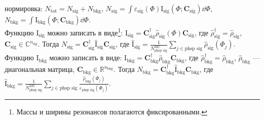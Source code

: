 \documentclass{beamer}
\begin{document}
\begin{frame}
\begin{minipage}[t]{0.49\linewidth}
  нормировка: $\textstyle{}N_{\text{tot}} = N_{\text{sig}} + N_{\text{bkg}}$,
  $\textstyle{}N_{\text{sig}}=\int\varepsilon_{\text{sig}}(\Phi)\text{I}_{\text{sig}}(\Phi;\bm{C}_{\text{sig}})\dd{\Phi}$,
  $\textstyle{}N_{\text{bkg}}=\int{}\text{I}_{\text{bkg}}(\Phi; \bm{C}_{\text{bkg}})\dd{\Phi}$.\\
  Функцию $\text{I}_{\text{sig}}$
  можно записать в виде\footnote{\scriptsize Массы и ширины резонансов полагаются
    фиксированными.}:
  $\textstyle{}\text{I}_{\text{sig}}=\bm{C}^{\dag}_{\text{sig}}\hat{\rho}_{\text{sig}}(\Phi)\bm{C}_{\text{sig}}$,
  где $\textstyle{}\hat{\rho}^{\dag}_{\text{sig}}=\hat{\rho}_{\text{sig}}$,
  $\textstyle{}\bm{C}_{\text{sig}}\in\mathbb{C}^{n_{\text{sig}}}$.
  Тогда $\textstyle{}N_{\text{sig}}=\bm{C}^{\dag}_{\text{sig}}\hat{\text{I}}_{\text{sig}}\bm{C}_{\text{sig}}$,
  где
  $\textstyle{}\hat{\text{I}}_{\text{sig}}=\frac{1}{N^{\text{MC}}_{\text{phsp sig}}}\sum_{j\in\text{phsp sig}}\hat{\rho}_{\text{sig}}(\Phi_j)$.\\
  Функцию $\textstyle{}\text{I}_{\text{bkg}}$ можно записать в виде:
  $\textstyle{}\text{I}_{\text{bkg}}=\bm{C}^{\dag}_{\text{bkg}}\hat{\rho}_{\text{bkg}}\bm{C}_{\text{bkg}}$, где
  $\textstyle{}\hat{\rho}^{\dag}_{\text{bkg}}=\hat{\rho}_{\text{bkg}}$, $\hat{\rho}_{\text{bkg}}$ ---
  диагональная матрица, $\bm{C}_{\text{bkg}}\in\mathbb{R}^{n_{\text{bkg}}}$. Тогда
  $\textstyle{}N_{\text{bkg}}=\bm{C}^{\dag}_{\text{bkg}}\hat{\text{I}}_{\text{bkg}}\bm{C}_{\text{bkg}}$, где
  $\textstyle{}\hat{\text{I}}_{\text{bkg}}=\frac{1}{N^{\text{MC}}_{\text{phsp sig}}}\sum_{j \in \text{phsp sig}}\frac{\hat{\rho}_{\text{bkg}}(\Phi_j)}{\varepsilon_{\text{phsp sig}}(\Phi_j)}$.
\end{minipage}
\end{frame}
\end{document}
